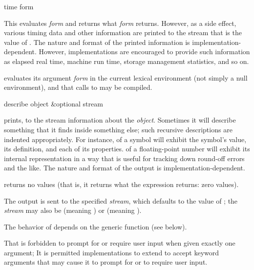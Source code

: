\begin{defmac}
time form

This evaluates \emph{form} and returns what \emph{form} returns.  However, as
a side effect, various timing data and other information are printed to
the stream that is the value of .  The nature and
format of the printed information is implementation-dependent.  However,
implementations are encouraged to provide such information as elapsed
real time, machine run time, storage management statistics, and so on.

 evaluates its argument \emph{form}
in the current lexical environment (not simply a null environment),
and that calls to  may be compiled.
\end{defmac}

\begin{defun}[Function]
describe object &optional stream

 prints, to the stream information about the \emph{object}.
Sometimes it will describe something that it finds inside something else;
such recursive descriptions are indented appropriately.  For instance,
 of a symbol will exhibit the symbol's value,
its definition, and each of its properties.   of a
floating-point number will exhibit its internal representation in a way
that is useful for tracking down round-off errors and the like.
The nature and format of the output is implementation-dependent.

 returns no values (that is, it returns what the expression
 returns: zero values).

The output is sent to the specified \emph{stream}, which
 defaults to the value of ;
 the \emph{stream} may also be  (meaning )
 or  (meaning ).

The behavior of  depends on the generic function
 (see below).
\end{defun}

That  is forbidden
to prompt for or require user input when given exactly one argument;
It is permitted implementations
to extend  to accept keyword arguments that may cause
it to prompt for or to require user input.

